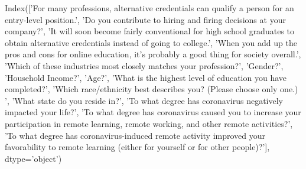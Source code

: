 Index(['For many professions, alternative credentials can qualify a person for an entry-level position.',
       'Do you contribute to hiring and firing decisions at your company?',
       'It will soon become fairly conventional for high school graduates to obtain alternative credentials instead of going to college.',
       'When you add up the pros and cons for online education, it's probably a good thing for society overall.',
       'Which of these industries most closely matches your profession?',
       'Gender?', 'Household Income?', 'Age?',
       'What is the highest level of education you have completed?',
       'Which race/ethnicity best describes you? (Please choose only one.) ',
       'What state do you reside in?',
       'To what degree has coronavirus negatively impacted your life?',
       'To what degree has coronavirus caused you to increase your participation in remote learning, remote working, and other remote activities?',
       'To what degree has coronavirus-induced remote activity improved your favorability to remote learning (either for yourself or for other people)?'],
      dtype='object')
